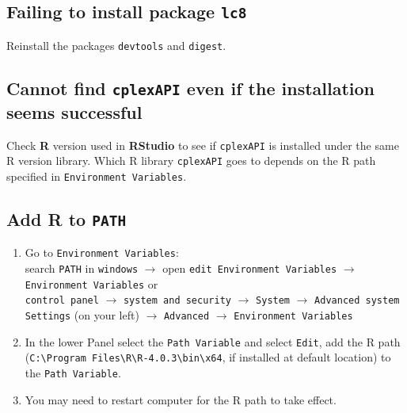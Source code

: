 \documentclass[]{article}
\begin{document}
\hypertarget{failing-to-install-package-lc8}{%
\subsection{\texorpdfstring{Failing to install package \texttt{lc8}}{Failing to install package lc8}}\label{failing-to-install-package-lc8}}

Reinstall the packages \texttt{devtools} and \texttt{digest}.

\hypertarget{cannot-find-cplexapi-even-if-the-installation-seems-successful}{%
\subsection{\texorpdfstring{Cannot find \texttt{cplexAPI} even if the installation seems successful}{Cannot find cplexAPI even if the installation seems successful}}\label{cannot-find-cplexapi-even-if-the-installation-seems-successful}}

Check \textbf{R} version used in \textbf{RStudio} to see if \texttt{cplexAPI} is installed under the same R version library. Which R library \texttt{cplexAPI} goes to depends on the R path specified in \texttt{Environment Variables}.

\hypertarget{add-r-to-path}{%
\subsection{\texorpdfstring{Add \textbf{R} to \texttt{PATH}}{Add R to PATH}}\label{add-r-to-path}}

\begin{enumerate}
\def\labelenumi{\arabic{enumi}.}
\item
  Go to \texttt{Environment Variables}:\\
  search \texttt{PATH} in \texttt{windows} \(\rightarrow\) open \texttt{edit Environment Variables} \(\rightarrow\) \texttt{Environment Variables}
  or\\
  \texttt{control panel} \(\rightarrow\) \texttt{system and security} \(\rightarrow\) \texttt{System} \(\rightarrow\) \texttt{Advanced system Settings} (on your left) \(\rightarrow\) \texttt{Advanced} \(\rightarrow\) \texttt{Environment Variables}
\item
  In the lower Panel select the \texttt{Path Variable} and select \texttt{Edit}, add the R path (\texttt{C:\textbackslash{}Program Files\textbackslash{}R\textbackslash{}R-4.0.3\textbackslash{}bin\textbackslash{}x64}, if installed at default location) to the \texttt{Path Variable}.
\item
  You may need to restart computer for the R path to take effect.
\end{enumerate}
\end{document}
